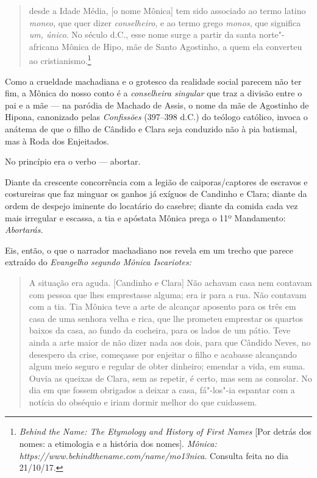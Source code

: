\begin{quote}
desde a Idade Média, [o nome Mônica] tem sido associado ao termo
latino \emph{moneo}, que quer dizer \emph{conselheiro}, e ao termo grego
\emph{monos}, que significa \emph{um, único}. No século  d.C., esse
nome surge a partir da santa norte"-africana Mônica de Hipo, mãe de Santo
Agostinho, a quem ela converteu ao cristianismo.\footnote{\emph{Behind
  the Name: The Etymology and History of First Names} [Por detrás dos
  nomes: a etimologia e a história dos nomes]. \emph{Mônica: https://www.behindthename.com/name/mo13nica}.
  Consulta feita no dia 21/10/17.}
\end{quote}

Como a crueldade machadiana e o grotesco da realidade social parecem não
ter fim, a Mônica do nosso conto é a \emph{conselheira singular} que
traz a divisão entre o pai e a mãe --- na paródia de Machado de Assis, o
nome da mãe de Agostinho de Hipona, canonizado pelas \emph{Confissões}
(397--398 d.C.) do teólogo católico, invoca o anátema de que o filho de
Cândido e Clara seja conduzido não à pia batismal, mas à Roda dos
Enjeitados.

No princípio era o verbo --- abortar.

Diante da crescente concorrência com a legião de caiporas/captores de
escravos e costureiras que faz minguar os ganhos já exíguos de Candinho
e Clara; diante da ordem de despejo iminente do locatário do casebre;
diante da comida cada vez mais irregular e escassa, a tia e apóstata
Mônica prega o 11º Mandamento: \emph{Abortarás. }

Eis, então, o que o narrador machadiano nos revela em um trecho que
parece extraído do \emph{Evangelho segundo Mônica Iscariotes: }

\begin{quote}
A situação era aguda. {[}Candinho e Clara{]} Não achavam casa nem
contavam com pessoa que lhes emprestasse alguma; era ir para a rua. Não
contavam com a tia. Tia Mônica teve a arte de alcançar aposento para os
três em casa de uma senhora velha e rica, que lhe prometeu emprestar os
quartos baixos da casa, ao fundo da cocheira, para os lados de um pátio.
Teve ainda a arte maior de não dizer nada aos dois, para que Cândido
Neves, no desespero da crise, começasse por enjeitar o filho e acabasse
alcançando algum meio seguro e regular de obter dinheiro; emendar a
vida, em suma. Ouvia as queixas de Clara, sem as repetir, é certo, mas
sem as consolar. No dia em que fossem obrigados a deixar a casa,
fá"-los"-ia espantar com a notícia do obséquio e iriam dormir melhor do
que cuidassem.
\end{quote}

